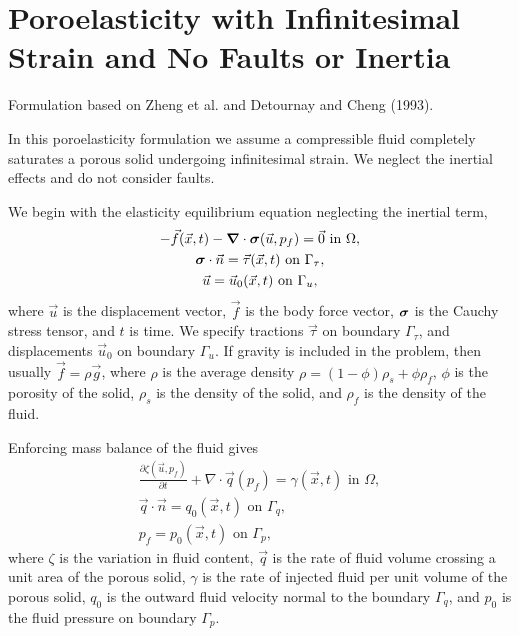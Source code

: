 \section{Poroelasticity with Infinitesimal Strain and No Faults or Inertia}


Formulation based on Zheng et al. and Detournay and Cheng (1993).

In this poroelasticity formulation we assume a compressible fluid
completely saturates a porous solid undergoing infinitesimal
strain. We neglect the inertial effects and do not consider faults.

We begin with the elasticity equilibrium equation neglecting the inertial term,
\begin{gather}
  - \vec{f}(\vec{x},t) - \tensor{\nabla} \cdot \tensor{\sigma}(\vec{u},p_f) = \vec{0} 
\text{ in }\Omega, \\
%
  \tensor{\sigma} \cdot \vec{n} = \vec{\tau}(\vec{x},t) \text{ on }\Gamma_\tau, \\
%
  \vec{u} = \vec{u}_0(\vec{x},t) \text{ on }\Gamma_u,
\end{gather}
where $\vec{u}$ is the displacement vector, $\vec{f}$ is the body
force vector, $\bm{\sigma}$ is the Cauchy stress tensor, and $t$
is time. We specify tractions $\vec{\tau}$ on boundary $\Gamma_\tau$, and
displacements $\vec{u}_0$ on boundary $\Gamma_u$. If gravity is included in
the problem, then usually $\vec{f} = \rho \vec{g}$, where $\rho$ is
the average density $\rho = (1-\phi)\rho_s + \phi \rho_f$, $\phi$ is
the porosity of the solid, $\rho_s$ is the density of the solid, and
$\rho_f$ is the density of the fluid.

Enforcing mass balance of the fluid gives
\begin{gather}
  \frac{\partial \zeta(\vec{u},p_f)}{\partial t} + \nabla \cdot \vec{q}(p_f) = 
\gamma(\vec{x},t) \text{ in }
\Omega, \\
%
  \vec{q} \cdot \vec{n} = q_0(\vec{x},t) \text{ on }\Gamma_q, \\
%
  p_f = p_0(\vec{x},t) \text{ on }\Gamma_p,
\end{gather}
where $\zeta$ is the variation in fluid content, $\vec{q}$ is the rate
of fluid volume crossing a unit area of the porous solid, $\gamma$ is
the rate of injected fluid per unit volume of the porous solid, $q_0$
is the outward fluid velocity normal to the boundary $\Gamma_q$, and
$p_0$ is the fluid pressure on boundary $\Gamma_p$.

